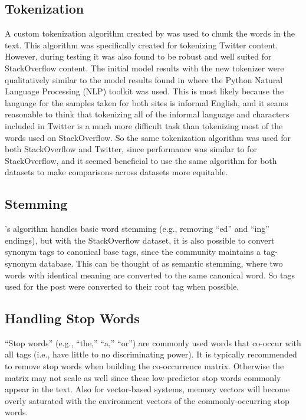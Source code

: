 \documentclass[man,floatsintext,donotrepeattitle]{apa6}
\begin{document}
\subsection{Tokenization}

A custom tokenization algorithm created by \textcite{Owoputi2013} was used to chunk the words in the text.
This algorithm was specifically created for tokenizing Twitter content.
However, during testing it was also found to be robust and well suited for StackOverflow content.
The initial model results with the new tokenizer were qualitatively similar to the model results found in \textcite{Stanley2013} where the Python Natural Language Processing (NLP) toolkit \parencite{Bird2009} was used.
This is most likely because the language for the samples taken for both sites is informal English,
and it seams reasonable to think that tokenizing all of the informal language and characters included in Twitter is a much more difficult task than tokenizing most of the words used on StackOverflow.
So the same tokenization algorithm was used for both StackOverflow and Twitter, since performance was similar to \textcite{Stanley2013} for StackOverflow,
and it seemed beneficial to use the same algorithm for both datasets to make comparisons across datasets more equitable.

\subsection{Stemming}

\textcite{Owoputi2013}'s algorithm handles basic word stemming (e.g., removing ``ed'' and ``ing'' endings), but
with the StackOverflow dataset, it is also possible to convert synonym tags to canonical base tags, since the community maintains a tag-synonym database.
This can be thought of as semantic stemming, where two words with identical meaning are converted to the same canonical word.
So tags used for the post were converted to their root tag when possible.

\subsection{Handling Stop Words}

``Stop words'' (e.g., ``the,'' ``a,'' ``or'') are commonly used words that co-occur with all tags (i.e., have little to no discriminating power).
It is typically recommended \parencite{Bird2009} to remove stop words when building the co-occurrence matrix.
Otherwise the matrix may not scale as well since these low-predictor stop words commonly appear in the text.
Also for vector-based systems, memory vectors will become overly saturated with the environment vectors of the commonly-occurring stop words.
\end{document}
